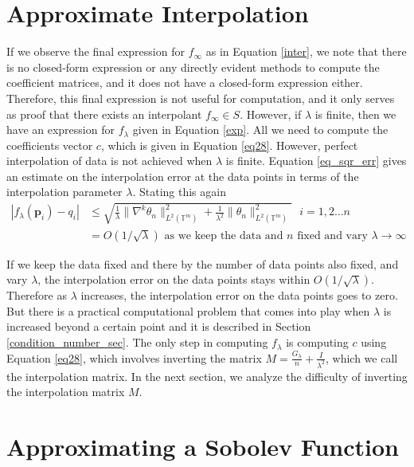 \documentclass[multixcb]{amstext-l}
\theoremstyle{plain}
\theoremstyle{definition}
\theoremstyle{definition}
\theoremstyle{remark}
\numberwithin{equation}{chapter}
\begin{document}
\section{Approximate Interpolation}
\label{approx_inter_sec}

If we observe the final expression for $f_{\infty}$ as in Equation \ref{inter}, we note that there is no closed-form expression or any directly evident methods to compute the coefficient matrices, and it does not have a closed-form expression either. Therefore, this final expression is not useful for computation, and it only serves as proof that there exists an interpolant $f_{\infty} \in S$. However, if $\lambda$ is finite, then we have an expression for $f_{\lambda}$ given in Equation \ref{exp}. All we need to compute the coefficients vector $c$, which is given in Equation \ref{eq28}. However, perfect interpolation of data is not achieved when $\lambda$ is finite. Equation \ref{eq_sqr_err} gives an estimate on the interpolation error at the data points in terms of the interpolation parameter $\lambda$. Stating this again 
\begin{equation}
    \label{int_error_est}
    \begin{aligned}
    \left|f_{\lambda}(\boldsymbol{p}_i)-q_i\right| &\le \sqrt{\frac{1}{\lambda}\|\nabla^k \theta_n\|_{L^2(\mathbb{T}^m)}^2 + \frac{1}{\lambda^2}\|\theta_n\|_{L^2(\mathbb{T}^m)}^2}  \mbox{             }i = 1,2\ldots n  \\
    &= O(1/\sqrt{\lambda}) \mbox{     as we keep the data and $n$ fixed and vary $\lambda\to\infty$}
    \end{aligned}
\end{equation}

If we keep the data fixed and there by the number of data points also fixed, and vary $\lambda$, the interpolation error on the data points stays within $O(1/\sqrt{\lambda})$. Therefore as $\lambda$ increases, the interpolation error on the data points goes to zero. But there is a practical computational problem that comes into play when $\lambda$ is increased beyond a certain point and it is described in Section \ref{condition_number_sec}. The only step in computing $f_{\lambda}$ is computing $c$ using Equation \ref{eq28}, which involves inverting the matrix $M = \frac{G_{\lambda}}{n} + \frac{I}{\lambda^2}$, which we call the interpolation matrix. In the next section, we analyze the difficulty of inverting the interpolation matrix $M$.  

\section{Approximating a Sobolev Function}
\label{approx_proof_sec}
\end{document}
